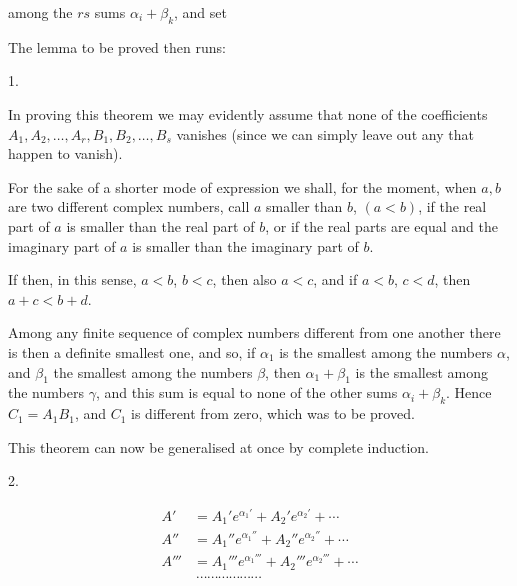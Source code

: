  among the $rs$ sums
$\alpha_i+\beta_k$, and set



The lemma to be proved then runs:

1. 

In proving this theorem we may evidently assume that none of the coefficients $A_1, A_2, \ldots, A_r, B_1, B_2, \ldots, B_s$ vanishes (since we can simply leave out any that happen to vanish).

For the sake of a shorter mode of expression we shall, for the moment, when $a, b$ are two different complex numbers, call $a$ smaller than $b$, $(a<b)$, if the real part of $a$ is smaller than the real part of $b$, or if the real parts are equal and the imaginary part of $a$ is smaller than the imaginary part of $b$.

If then, in this sense, $a<b$, $b<c$, then also $a<c$, and if $a<b$, $c<d$, then $a+c<b+d$.

Among any finite sequence of complex numbers different from one another there is then a definite smallest one, and so, if $\alpha_1$ is the smallest among the numbers $\alpha$, and $\beta_1$ the smallest among the numbers $\beta$, then $\alpha_1+\beta_1$ is the smallest among the numbers $\gamma$, and this sum is equal to none of the other sums $\alpha_i+\beta_k$. Hence $C_1=A_1B_1$, and $C_1$ is different from zero, which was to be proved.

This theorem can now be generalised at once by complete induction.

2. 

\[
\begin{aligned}
A' &= A_1'e^{\alpha_1'}+A_2'e^{\alpha_2'}+\cdots\\
A'' &= A_1''e^{\alpha_1''}+A_2''e^{\alpha_2''}+\cdots\\
A''' &= A_1'''e^{\alpha_1'''}+A_2'''e^{\alpha_2'''}+\cdots\\
&\ \cdots\cdots\cdots\cdots\cdots\cdots
\end{aligned}
\]



